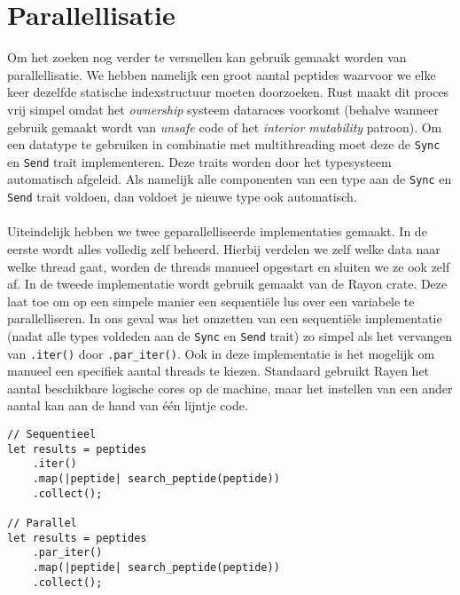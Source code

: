 \section{Parallellisatie}\label{sec:parallellisatie}
Om het zoeken nog verder te versnellen kan gebruik gemaakt worden van parallellisatie.
We hebben namelijk een groot aantal peptides waarvoor we elke keer dezelfde statische indexstructuur moeten doorzoeken.
Rust maakt dit proces vrij simpel omdat het \textit{ownership} systeem dataraces voorkomt (behalve wanneer gebruik gemaakt wordt van \textit{unsafe} code of het \textit{interior mutability} patroon)\cite{rust_data_races}.
Om een datatype te gebruiken in combinatie met multithreading moet deze de \texttt{Sync} en \texttt{Send} trait implementeren.
Deze traits worden door het typesysteem automatisch afgeleid.
Als namelijk alle componenten van een type aan de \texttt{Sync} en \texttt{Send} trait voldoen, dan voldoet je nieuwe type ook automatisch.
\\ \\
Uiteindelijk hebben we twee geparallelliseerde implementaties gemaakt.
In de eerste wordt alles volledig zelf beheerd.
Hierbij verdelen we zelf welke data naar welke thread gaat, worden de threads manueel opgestart en sluiten we ze ook zelf af.
In de tweede implementatie wordt gebruik gemaakt van de Rayon crate\cite{rayon}.
Deze laat toe om op een simpele manier een sequentiële lus over een variabele te parallelliseren.
In ons geval was het omzetten van een sequentiële implementatie (nadat alle types voldeden aan de \texttt{Sync} en \texttt{Send} trait) zo simpel als het vervangen van \texttt{.iter()} door \texttt{.par\_iter()}.
Ook in deze implementatie is het mogelijk om manueel een specifiek aantal threads te kiezen.
Standaard gebruikt Rayen het aantal beschikbare logische cores op de machine, maar het instellen van een ander aantal kan aan de hand van één lijntje code.

\begin{verbatim}
// Sequentieel
let results = peptides
    .iter()
    .map(|peptide| search_peptide(peptide))
    .collect();

// Parallel
let results = peptides
    .par_iter()
    .map(|peptide| search_peptide(peptide))
    .collect();
\end{verbatim}

